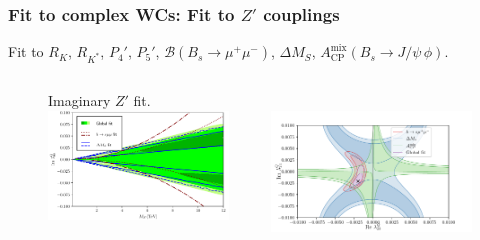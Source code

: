 \documentclass[mathserif, 10pt, dvipsnames]{beamer}
\begin{document}
\begin{frame}\frametitle{Fit to complex WCs: Fit to $Z'$ couplings}
Fit to $R_K$, $R_{K^*}$, $P_4'$, $P_5'$, $\mathcal{B}(B_s \to \mu^+ \mu^-)$, $\Delta M_S$, $A_\mathrm{CP}^\mathrm{mix}(B_s \to J/\psi\, \phi)$.\\[0.3em]

    \begin{figure}
        \begin{columns}
            \begin{column}{0.48\textwidth}
                \centering
{\small Imaginary $Z'$ fit.}\\
\includegraphics[width=0.9\textwidth]{figures/fitim_Z.pdf}
            \end{column}
            \begin{column}{0.48\textwidth}
\hspace*{1.5cm}{\small Complex $Z'$ fit.}\\
\includegraphics[width=1.0\textwidth]{figures/fitcompl_Z.pdf}
            \end{column}
        \end{columns}

\end{figure}
\end{frame}
\end{document}

